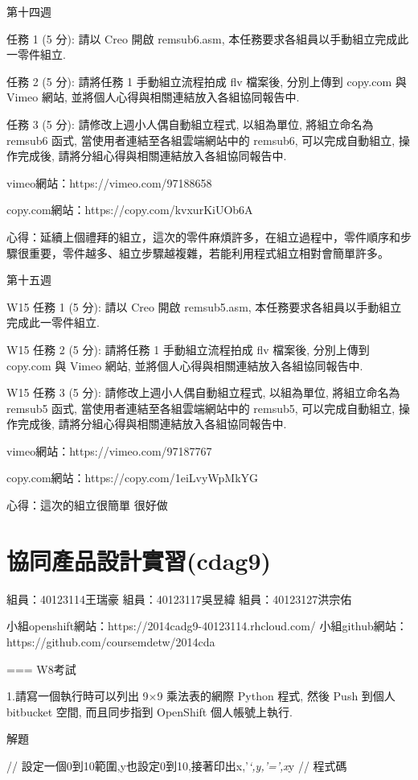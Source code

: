 \documentclass[]{article}
\begin{document}
第十四週

任務 1 (5 分): 請以 Creo 開啟 remsub6.asm,
本任務要求各組員以手動組立完成此一零件組立.

任務 2 (5 分): 請將任務 1 手動組立流程拍成 flv 檔案後, 分別上傳到
copy.com 與 Vimeo 網站, 並將個人心得與相關連結放入各組協同報告中.

任務 3 (5 分): 請修改上週小人偶自動組立程式, 以組為單位, 將組立命名為
remsub6 函式, 當使用者連結至各組雲端網站中的 remsub6, 可以完成自動組立,
操作完成後, 請將分組心得與相關連結放入各組協同報告中.

vimeo網站：https://vimeo.com/97188658

copy.com網站：https://copy.com/kvxurKiUOb6A

心得：延續上個禮拜的組立，這次的零件麻煩許多，在組立過程中，零件順序和步驟很重要，零件越多、組立步驟越複雜，若能利用程式組立相對會簡單許多。

第十五週

W15 任務 1 (5 分): 請以 Creo 開啟 remsub5.asm,
本任務要求各組員以手動組立完成此一零件組立.

W15 任務 2 (5 分): 請將任務 1 手動組立流程拍成 flv 檔案後, 分別上傳到
copy.com 與 Vimeo 網站, 並將個人心得與相關連結放入各組協同報告中.

W15 任務 3 (5 分): 請修改上週小人偶自動組立程式, 以組為單位,
將組立命名為 remsub5 函式, 當使用者連結至各組雲端網站中的 remsub5,
可以完成自動組立, 操作完成後, 請將分組心得與相關連結放入各組協同報告中.

vimeo網站：https://vimeo.com/97187767

copy.com網站：https://copy.com/1eiLvyWpMkYG

心得：這次的組立很簡單 很好做

\section{協同產品設計實習(cdag9)}\label{ux5354ux540cux7522ux54c1ux8a2dux8a08ux5be6ux7fd2cdag9}

組員：40123114王瑞豪 組員：40123117吳昱緯 組員：40123127洪宗佑

小組openshift網站：https://2014cadg9-40123114.rhcloud.com/
小組github網站：https://github.com/coursemdetw/2014cda

=== W8考試

1.請寫一個執行時可以列出 9×9 乘法表的網際 Python 程式, 然後 Push 到個人
bitbucket 空間, 而且同步指到 OpenShift 個人帳號上執行.

解題

// 設定一個0到10範圍,y也設定0到10,接著印出x,'\emph{`,y,'=',x}y // 程式碼
\end{document}
